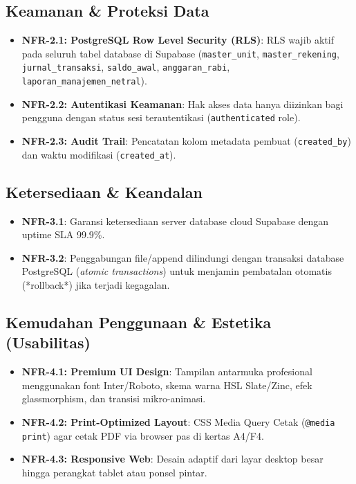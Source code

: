 \documentclass[11pt,a4paper]{article}
\begin{document}
\subsection{Keamanan \& Proteksi Data}
\begin{itemize}
    \item \textbf{NFR-2.1: PostgreSQL Row Level Security (RLS)}: RLS wajib aktif pada seluruh tabel database di Supabase (\texttt{master\_unit}, \texttt{master\_rekening}, \texttt{jurnal\_transaksi}, \texttt{saldo\_awal}, \texttt{anggaran\_rabi}, \texttt{laporan\_manajemen\_netral}).
    \item \textbf{NFR-2.2: Autentikasi Keamanan}: Hak akses data hanya diizinkan bagi pengguna dengan status sesi terautentikasi (\texttt{authenticated} role).
    \item \textbf{NFR-2.3: Audit Trail}: Pencatatan kolom metadata pembuat (\texttt{created\_by}) dan waktu modifikasi (\texttt{created\_at}).
\end{itemize}

\subsection{Ketersediaan \& Keandalan}
\begin{itemize}
    \item \textbf{NFR-3.1}: Garansi ketersediaan server database cloud Supabase dengan uptime SLA 99.9\%.
    \item \textbf{NFR-3.2}: Penggabungan file/append dilindungi dengan transaksi database PostgreSQL (\textit{atomic transactions}) untuk menjamin pembatalan otomatis (*rollback*) jika terjadi kegagalan.
\end{itemize}

\subsection{Kemudahan Penggunaan \& Estetika (Usabilitas)}
\begin{itemize}
    \item \textbf{NFR-4.1: Premium UI Design}: Tampilan antarmuka profesional menggunakan font Inter/Roboto, skema warna HSL Slate/Zinc, efek glassmorphism, dan transisi mikro-animasi.
    \item \textbf{NFR-4.2: Print-Optimized Layout}: CSS Media Query Cetak (\texttt{@media print}) agar cetak PDF via browser pas di kertas A4/F4.
    \item \textbf{NFR-4.3: Responsive Web}: Desain adaptif dari layar desktop besar hingga perangkat tablet atau ponsel pintar.
\end{itemize}
\end{document}
